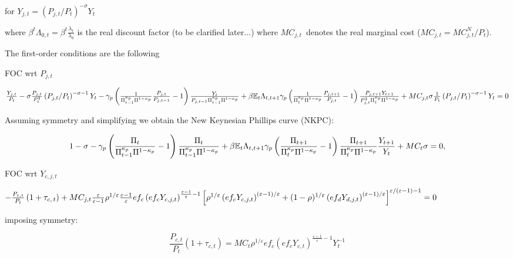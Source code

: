 \documentclass{article}
\begin{document}
for $Y_{j,t}=\left( P_{j,t}/P_{t}\right) ^{-\sigma }Y_{t}$

where $\beta ^{t}\Lambda _{0,t}=\beta ^{t}\frac{\lambda _{t}}{\lambda _{0}}$
is the real discount factor (to be clarified later...) where $MC_{j,t}$\
denotes the real marginal cost ($MC_{j,t}=MC_{j,t}^{N}/P_{t}$).

The first-order conditions are the following

FOC wrt $P_{j,t}$

$\frac{Y_{j,t}}{P_{t}}-\sigma \frac{P_{j,t}}{P_{t}^{2}}\left(
P_{j,t}/P_{t}\right) ^{-\sigma -1}Y_{t}-\gamma _{p}\left( \frac{1}{\Pi
_{t-1}^{\kappa _{p}}\Pi ^{1-\kappa _{p}}}\frac{P_{j,t}}{P_{j,t-1}}-1\right) 
\frac{Y_{t}}{P_{j,t-1}\Pi _{t-1}^{\kappa _{p}}\Pi ^{1-\kappa _{p}}}+\beta 
\mathbb{E}_{t}\Lambda _{t,t+1}\gamma _{p}\left( \frac{1}{\Pi _{t}^{\kappa
_{p}}\Pi ^{1-\kappa _{p}}}\frac{P_{j,t+1}}{P_{j,t}}-1\right) \frac{%
P_{j,t+1}Y_{t+1}}{P_{j,t}^{2}\Pi _{t}^{\kappa _{p}}\Pi ^{1-\kappa _{p}}}%
+MC_{j,t}\sigma \frac{1}{P_{t}}\left( P_{j,t}/P_{t}\right) ^{-\sigma
-1}Y_{t}=0$

Assuming symmetry and simplifying we obtain the New Keynesian Phillips curve
(NKPC):

\begin{equation*}
1-\sigma -\gamma _{p}\left( \frac{\Pi _{t}}{\Pi _{t-1}^{\kappa _{p}}\Pi
^{1-\kappa _{p}}}-1\right) \frac{\Pi _{t}}{\Pi _{t-1}^{\kappa _{p}}\Pi
^{1-\kappa _{p}}}+\beta \mathbb{E}_{t}\Lambda _{t,t+1}\gamma _{p}\left( 
\frac{\Pi _{t+1}}{\Pi _{t}^{\kappa _{p}}\Pi ^{1-\kappa _{p}}}-1\right) \frac{%
\Pi _{t+1}}{\Pi _{t}^{\kappa _{p}}\Pi ^{1-\kappa _{p}}}\frac{Y_{t+1}}{Y_{t}}%
+MC_{t}\sigma =0,
\end{equation*}

FOC wrt $Y_{c,j,t}$

$-\frac{P_{c,t}}{P_{t}}\left( 1+\tau _{c,\,t}\right) +MC_{j,t}\frac{%
\varepsilon }{\varepsilon -1}\rho ^{1/\varepsilon }\frac{\varepsilon -1}{%
\varepsilon }ef_{c}\left( ef_{c}Y_{c,j,t}\right) ^{\frac{\varepsilon -1}{%
\varepsilon }-1}\left[ \rho ^{1/\varepsilon }\left( ef_{c}Y_{c,j,t}\right)
^{\left( \varepsilon -1\right) /\varepsilon }+(1-\rho )^{1/\varepsilon
}\left( ef_{d}Y_{d,j,t}\right) ^{\left( \varepsilon -1\right) /\varepsilon }%
\right] ^{\varepsilon /(\varepsilon -1)-1}=0$

imposing symmetry:

\begin{equation*}
\frac{P_{c,t}}{P_{t}}\left( 1+\tau _{c,t}\right) =MC_{t}\rho ^{1/\varepsilon
}ef_{c}\left( ef_{c}Y_{c,t}\right) ^{\frac{\varepsilon -1}{\varepsilon }%
-1}Y_{t}^{-1}
\end{equation*}
\end{document}
